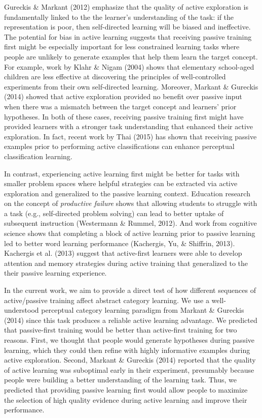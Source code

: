 \documentclass[10pt, letterpaper]{article}
\begin{document}
Gureckis \& Markant (2012) emphasize that the quality of active
exploration is fundamentally linked to the the learner's understanding
of the task: if the representation is poor, then self-directed learning
will be biased and ineffective. The potential for bias in active
learning suggests that receiving passive training first might be
especially important for less constrained learning tasks where people
are unlikely to generate examples that help them learn the target
concept. For example, work by Klahr \& Nigam (2004) shows that
elementary school-aged children are less effective at discovering the
principles of well-controlled experiments from their own self-directed
learning. Moreover, Markant \& Gureckis (2014) showed that active
exploration provided no benefit over passive input when there was a
mismatch between the target concept and learners' prior hypotheses. In
both of these cases, receiving passive training first might have
provided learners with a stronger task understanding that enhanced their
active exploration. In fact, recent work by Thai (2015) has shown that
receiving passive examples prior to performing active classifications
can enhance perceptual classification learning.

In contrast, experiencing active learning first might be better for
tasks with smaller problem spaces where helpful strategies can be
extracted via active exploration and generalized to the passive learning
context. Education research on the concept of \emph{productive failure}
shows that allowing students to struggle with a task (e.g.,
self-directed problem solving) can lead to better uptake of subsequent
instruction (Westermann \& Rummel, 2012). And work from cognitive
science shows that completing a block of active learning prior to
passive learning led to better word learning performance (Kachergis, Yu,
\& Shiffrin, 2013). Kachergis et al. (2013) suggest that active-first
learners were able to develop attention and memory strategies during
active training that generalized to the their passive learning
experience.

In the current work, we aim to provide a direct test of how different
sequences of active/passive training affect abstract category learning.
We use a well-understood perceptual category learning paradigm from
Markant \& Gureckis (2014) since this task produces a reliable active
learning advantage. We predicted that passive-first training would be
better than active-first training for two reasons. First, we thought
that people would generate hypotheses during passive learning, which
they could then refine with highly informative examples during active
exploration. Second, Markant \& Gureckis (2014) reported that the
quality of active learning was suboptimal early in their experiment,
presumably because people were building a better understanding of the
learning task. Thus, we predicted that providing passive learning first
would allow people to maximize the selection of high quality evidence
during active learning and improve their performance.
\end{document}

